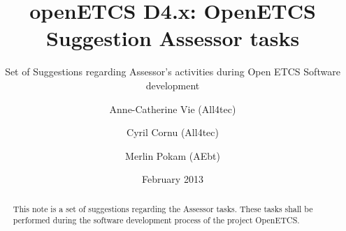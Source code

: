 \documentclass{template/openetcs_report}
\begin{document}
\frontmatter
{}




\title{openETCS D4.x: OpenETCS Suggestion Assessor tasks}

\subtitle{Set of Suggestions regarding Assessor's activities during Open ETCS Software development}

\date{February 2013}

\author{Anne-Catherine Vie (All4tec) \and Cyril Cornu (All4tec) \and Merlin Pokam (AEbt)}






\begin{abstract}
This note is a set of suggestions regarding the Assessor tasks. These tasks shall be performed during the software development process of the project OpenETCS. 
\end{abstract}

\maketitle
\tableofcontents



\end{document}
